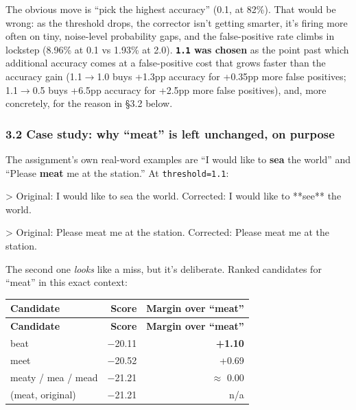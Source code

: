 \documentclass[11pt,a4paper]{article}
\begin{document}
The obvious move is ``pick the highest accuracy'' (0.1, at 82\%). That would be wrong: as the threshold drops, the corrector isn't getting smarter, it's firing more often on tiny, noise-level probability gaps, and the false-positive rate climbs in lockstep (8.96\% at 0.1 vs 1.93\% at 2.0). \textbf{\texttt{1.\allowbreak{}1} was chosen} as the point past which additional accuracy comes at a false-positive cost that grows faster than the accuracy gain (1.1$\rightarrow$1.0 buys +1.3pp accuracy for +0.35pp more false positives; 1.1$\rightarrow$0.5 buys +6.5pp accuracy for +2.5pp more false positives), and, more concretely, for the reason in \S{}3.2 below.

\subsubsection*{3.2 Case study: why ``meat'' is left unchanged, on purpose}

The assignment's own real-word examples are ``I would like to \textbf{sea} the world'' and ``Please \textbf{meat} me at the station.'' At \texttt{threshold=1.\allowbreak{}1}:

\begin{codeblock}
> Original:  I would like to sea the world.
Corrected: I would like to **see** the world.
\end{codeblock}

\begin{codeblock}
> Original:  Please meat me at the station.
Corrected: Please meat me at the station.
\end{codeblock}

The second one \textit{looks} like a miss, but it's deliberate. Ranked candidates for ``meat'' in this exact context:

{\small
\setlength{\tabcolsep}{4pt}
\begin{longtable}{lrr}
\toprule
\textbf{Candidate} & \textbf{Score} & \textbf{Margin over ``meat''} \\
\midrule
\endfirsthead
\toprule
\textbf{Candidate} & \textbf{Score} & \textbf{Margin over ``meat''} \\
\midrule
\endhead
beat & $-$20.11 & \textbf{+1.10} \\
meet & $-$20.52 & +0.69 \\
meaty / mea / mead & $-$21.21 & $\approx$ 0.00 \\
(meat, original) & $-$21.21 & n/a \\
\bottomrule
\end{longtable}}
\end{document}

